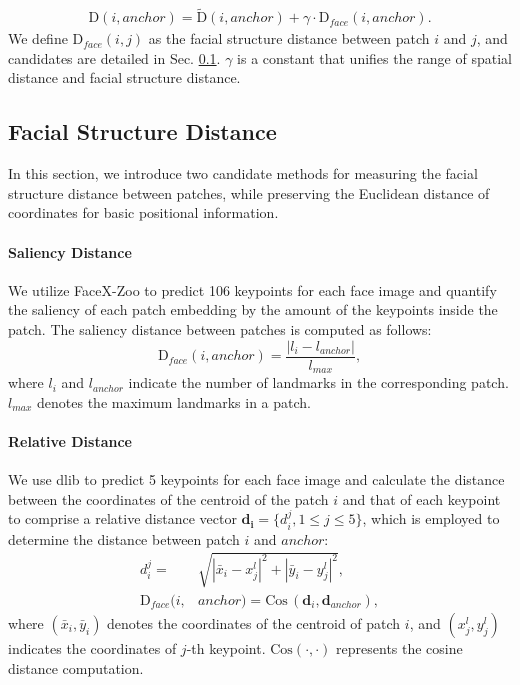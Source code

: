 \documentclass[sigconf]{acmart}
\begin{document}
\begin{equation}
\begin{aligned}
\mbox{D}(i,anchor) = \tilde{\mbox{D}}(i,anchor)+\gamma \cdot \mbox{D}_{face}(i,anchor).
\label{eq9}
\end{aligned}
\end{equation}
We define $\mbox{D}_{face}(i,j)$ as the facial structure distance between patch $i$ and $j$, and candidates are detailed in Sec. \ref{section:candidates}. $\gamma$ is a constant that unifies the range of spatial distance and facial structure distance.
\subsection{Facial Structure Distance}
\label{section:candidates}
In this section, we introduce two candidate methods for measuring the facial structure distance between patches, while preserving the Euclidean distance of coordinates for basic positional information.
\paragraph{Saliency Distance}
We utilize FaceX-Zoo \cite{facex} to predict 106 keypoints for each face image and quantify the saliency of each patch embedding by the amount of the keypoints inside the patch. The saliency distance between patches is computed as follows:
\begin{equation}
\mbox{D}_{face}(i,anchor)= \frac{|l_i-l_{anchor}|}{l_{max}},
\label{eq10}
\end{equation}
where $l_i$ and $l_{anchor}$ indicate the number of landmarks in the corresponding patch. $l_{max}$ denotes the maximum landmarks in a patch.
\paragraph{Relative Distance}
We use dlib \cite{dlib} to predict 5 keypoints for each face image and calculate the distance between the coordinates of the centroid of the patch $i$ and that of each keypoint to comprise a relative distance vector $\bm{d_i}=\{d_i^j, 1\le j\le5\}$, which is employed to determine the distance between patch $i$ and $anchor$:
\begin{equation}
\begin{aligned}
d_i^j = &\sqrt{|\bar{x}_i- x^l_j|^2+|\bar{y}_i- y^l_j|^2},\\ 
\mbox{D}_{face}(i,&anchor)= \mbox{Cos}\,(\bm{d}_i,\bm{d}_{anchor}),
\end{aligned}
\end{equation}
where $(\bar{x}_i,\bar{y}_i)$ denotes the coordinates of the centroid of patch $i$, and $(x^l_j,y^l_j)$ indicates the coordinates of $j$-th keypoint. $\mbox{Cos}(\cdot,\cdot)$ represents the cosine distance computation.
\end{document}
